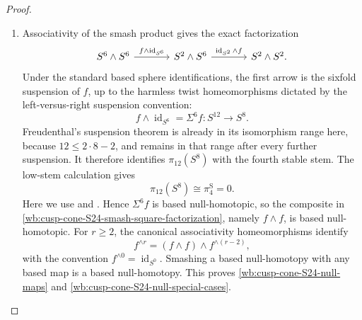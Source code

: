 \begin{proof}
\begin{enumerate}[label=\arabic*.,leftmargin=*]
\item Associativity of the smash product gives the
exact factorization
\begin{equation}
 \begin{tikzcd}[column sep=large]
 S^6\wedge S^6
 \arrow[r,"f\wedge\operatorname{id}_{S^6}"]&
 S^2\wedge S^6
 \arrow[r,"\operatorname{id}_{S^2}\wedge f"]&
 S^2\wedge S^2 .
 \end{tikzcd}
 \label{wb:cusp-cone-S24-smash-square-factorization}
\end{equation}
Under the standard based sphere identifications, the first arrow is the
sixfold suspension of \(f\), up to the harmless twist homeomorphisms dictated
by the left-versus-right suspension convention:
\begin{equation}
 f\wedge\operatorname{id}_{S^6}
 =\Sigma^6f:S^{12}\longrightarrow S^8.
 \label{wb:cusp-cone-S24-sixfold-suspension}
\end{equation}
Freudenthal's suspension theorem is already in its isomorphism range here,
because \(12\leq 2\cdot8-2\), and remains in that range after every further
suspension.  It therefore identifies \(\pi_{12}(S^8)\) with the fourth
stable stem.  The low-stem calculation gives
\label{qa:III:layout:11}
\begin{equation}
 \pi_{12}(S^8)\cong\pi_4^{\mathrm S}=0.
 \label{wb:cusp-cone-fourth-stable-stem}
\end{equation}
Here we use \cite[Corollary~4.24, p.~360]{Hatcher2002} and
\cite[Table~1, p.~113]{IsaksenWangXu2023}.
Hence \(\Sigma^6f\) is based null-homotopic, so the composite in
\cref{wb:cusp-cone-S24-smash-square-factorization}, namely
\(f\wedge f\), is based null-homotopic.  For \(r\geq2\), the canonical
associativity homeomorphisms identify
\begin{equation}
 f^{\wedge r}=(f\wedge f)\wedge f^{\wedge(r-2)},
\end{equation}
with the convention \(f^{\wedge0}=\operatorname{id}_{S^0}\).  Smashing a
based null-homotopy with any based map is a based null-homotopy.  This proves
\cref{wb:cusp-cone-S24-null-maps} and \cref{wb:cusp-cone-S24-null-special-cases}.
\end{enumerate}
\end{proof}

